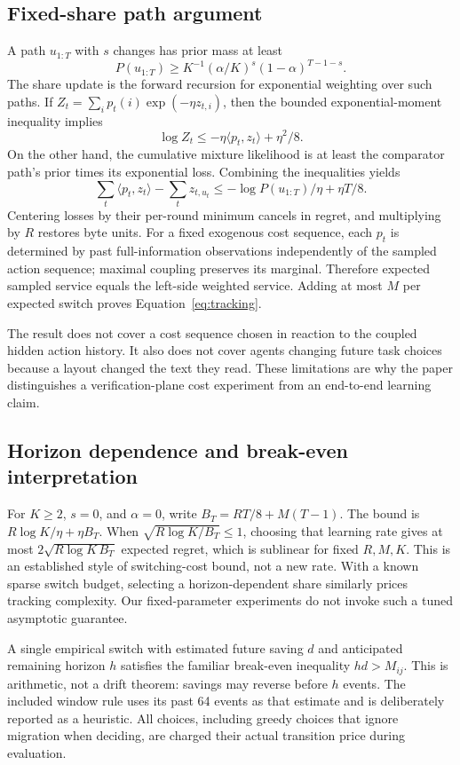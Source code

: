\subsection{Fixed-share path argument}
A path $u_{1:T}$ with $s$ changes has prior mass at least
\[
 P(u_{1:T})\ge K^{-1}(\alpha/K)^s(1-\alpha)^{T-1-s}.
\]
The share update is the forward recursion for exponential weighting over such paths. If $Z_t=\sum_ip_t(i)\exp(-\eta z_{t,i})$, then the bounded exponential-moment inequality implies
\[
 \log Z_t\le-\eta\langle p_t,z_t\rangle+\eta^2/8.
\]
On the other hand, the cumulative mixture likelihood is at least the comparator path's prior times its exponential loss. Combining the inequalities yields
\[
 \sum_t\langle p_t,z_t\rangle-\sum_tz_{t,u_t}
 \le-\log P(u_{1:T})/\eta+\eta T/8.
\]
Centering losses by their per-round minimum cancels in regret, and multiplying by $R$ restores byte units. For a fixed exogenous cost sequence, each $p_t$ is determined by past full-information observations independently of the sampled action sequence; maximal coupling preserves its marginal. Therefore expected sampled service equals the left-side weighted service. Adding at most $M$ per expected switch proves Equation~\eqref{eq:tracking}.

The result does not cover a cost sequence chosen in reaction to the coupled hidden action history. It also does not cover agents changing future task choices because a layout changed the text they read. These limitations are why the paper distinguishes a verification-plane cost experiment from an end-to-end learning claim.

\subsection{Horizon dependence and break-even interpretation}
For $K\ge2$, $s=0$, and $\alpha=0$, write $B_T=RT/8+M(T-1)$. The bound is $R\log K/\eta+\eta B_T$. When $\sqrt{R\log K/B_T}\le1$, choosing that learning rate gives at most $2\sqrt{R\log K\,B_T}$ expected regret, which is sublinear for fixed $R,M,K$. This is an established style of switching-cost bound, not a new rate. With a known sparse switch budget, selecting a horizon-dependent share similarly prices tracking complexity. Our fixed-parameter experiments do not invoke such a tuned asymptotic guarantee.

A single empirical switch with estimated future saving $d$ and anticipated remaining horizon $h$ satisfies the familiar break-even inequality $hd>M_{ij}$. This is arithmetic, not a drift theorem: savings may reverse before $h$ events. The included window rule uses its past 64 events as that estimate and is deliberately reported as a heuristic. All choices, including greedy choices that ignore migration when deciding, are charged their actual transition price during evaluation.


